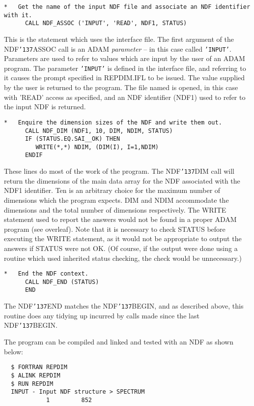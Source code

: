 \documentclass[twoside,11pt]{article}
\renewcommand{\_}{{\tt\char'137}}
\begin{document}
\begin{verbatim}
*   Get the name of the input NDF file and associate an NDF identifier with it.
      CALL NDF_ASSOC ('INPUT', 'READ', NDF1, STATUS)
\end{verbatim}
This is the statement which uses the interface file.
The first argument of the NDF\_ASSOC call is an ADAM {\sl parameter} --
in this case called {\tt 'INPUT'}.
Parameters are used to refer to values which are input by the user of an
ADAM program.
The parameter {\tt'INPUT'} is defined in the interface file, and referring to it
causes the prompt specified in REPDIM.IFL to be issued.
The value
supplied by the user is returned to the program.
The file named is opened, in this case with 'READ' access
as specified, and an NDF identifier (NDF1) used to refer to the input NDF
is returned.
\begin{verbatim}
*   Enquire the dimension sizes of the NDF and write them out.
      CALL NDF_DIM (NDF1, 10, DIM, NDIM, STATUS)
      IF (STATUS.EQ.SAI__OK) THEN
         WRITE(*,*) NDIM, (DIM(I), I=1,NDIM)
      ENDIF
\end{verbatim}
These lines do most of the work of the program.
The NDF\_DIM call will return the dimensions of the main data array
for the NDF associated with the NDF1 identifier.
Ten is an arbitrary choice  for the maximum number of dimensions
which the program expects.
DIM and NDIM accommodate the dimensions and the total number of dimensions
respectively.
The WRITE statement used to report the answers would not be found in
a proper ADAM program (see overleaf).
Note that it is necessary to check STATUS before executing the WRITE
statement, as it would not be appropriate to output the answers
if STATUS were not OK.
(Of course, if the output were done  using a routine which used
inherited status checking, the check would be unnecessary.)
\begin{verbatim}
*   End the NDF context.
      CALL NDF_END (STATUS)
      END
\end{verbatim}
The NDF\_END matches the NDF\_BEGIN,
and as described above, this routine does any tidying up incurred by
calls made since the last NDF\_BEGIN.

The program can be compiled and linked  and tested with
an NDF as shown below:
\begin{verbatim}
  $ FORTRAN REPDIM
  $ ALINK REPDIM
  $ RUN REPDIM
  INPUT - Input NDF structure > SPECTRUM
            1         852
\end{verbatim}

\newpage
\end{document}

